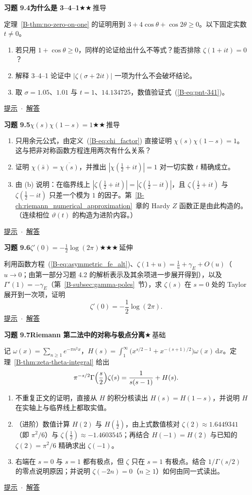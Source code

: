 \documentclass[11pt,a4paper]{article}
\newcommand{\dd}{\,\mathrm{d}}
\newcommand{\bref}[1]{\ref*{B-#1}}
\newcommand{\lvI}{$\bigstar$\,基础}
\newcommand{\lvII}{$\bigstar\bigstar$\,推导}
\newcommand{\lvIII}{$\bigstar\bigstar\bigstar$\,延伸}
\newcommand{\Q}[3]{%
  \par\addvspace{1.1em}\noindent
  \hypertarget{q:#1}{}\textbf{习题 #1}\quad\textbf{#3}\hfill{\small #2}\par
  \nopagebreak\smallskip}
\newcommand{\toHint}[1]{\hfill{\small\hyperlink{h:#1}{提示}\ $\cdot$\ \hyperlink{s:#1}{解答}}}
\begin{document}
\Q{9.4}{\lvII}{为什么是 3--4--1}
定理~\bref{thm:no-zero-on-one} 的证明用到 $3+4\cos\theta+\cos2\theta\ge0$。以下固定实数 $t\ne0$。
\begin{enumerate}
  \item 若只用 $1+\cos\theta\ge0$，同样的论证给出什么不等式？能否排除 $\zeta(1+it)=0$？
  \item 解释 3--4--1 论证中 $|\zeta(\sigma+2it)|$ 一项为什么不会破坏结论。
  \item 取 $\sigma=1.05$、$1.01$ 与 $t=1$、$14.134725$，数值验证式~(\bref{eq:pnt-341})。
\end{enumerate}
\toHint{9.4}

\Q{9.5}{\lvII}{$\chi(s)\chi(1-s)=1$}
\begin{enumerate}
  \item 只用余元公式，由定义~(\bref{eq:chi_factor}) 直接证明 $\chi(s)\chi(1-s)=1$。这与把非对称函数方程连用两次有什么关系？
  \item 证明 $\chi(\bar s)=\overline{\chi(s)}$，并推出 $|\chi(\tfrac12+it)|=1$ 对一切实数 $t$ 精确成立。
  \item 由 (b) 说明：在临界线上 $|\zeta(\tfrac12+it)|=|\zeta(\tfrac12-it)|$，且 $\zeta(\tfrac12+it)$ 与 $\zeta(\tfrac12-it)$ 只差一个模为 $1$ 的因子。第~\bref{ch:riemann_numerical_approximation}~章的 Hardy $Z$ 函数正是由此构造的。（连续相位 $\vartheta(t)$ 的构造为进阶内容。）
\end{enumerate}
\toHint{9.5}

\Q{9.6}{\lvIII}{$\zeta'(0)=-\tfrac12\log(2\pi)$}
利用函数方程~(\bref{eq:asymmetric_fe_alt})、$\zeta(1+u)=\frac1u+\gamma_E+O(u)$（$u\to0$；由第一部分习题 4.2 的解析表示及其余项进一步展开得到），以及 $\Gamma'(1)=-\gamma_E$（第~\bref{subsec:gamma-poles}~节），求 $\zeta(s)$ 在 $s=0$ 处的 Taylor 展开到一次项，证明
\[
  \zeta'(0)=-\frac12\log(2\pi).
\]
\toHint{9.6}

\Q{9.7}{\lvI}{Riemann 第二法中的对称与极点分离}
记 $\omega(x)=\sum_{n\ge1}e^{-\pi n^2x}$，$H(s)=\int_1^\infty\bigl(x^{s/2-1}+x^{-(s+1)/2}\bigr)\omega(x)\dd x$。定理~\bref{thm:zeta-theta-integral} 给出
\[
  \pi^{-s/2}\Gamma\Bigl(\frac s2\Bigr)\zeta(s)=\frac1{s(s-1)}+H(s).
\]
\begin{enumerate}
  \item 不重复正文的证明，直接从 $H$ 的积分核读出 $H(s)=H(1-s)$，并说明 $H$ 在实轴上与临界线上都取实值。
  \item （进阶）数值计算 $H(2)$ 与 $H(\tfrac12)$，由上式数值核对 $\zeta(2)\approx1.6449341$（即 $\pi^2/6$）与 $\zeta(\tfrac12)\approx-1.4603545$；再结合 $H(-1)=H(2)$ 与已知的 $\zeta(2)=\pi^2/6$ 精确求出 $\zeta(-1)$。
  \item 右端在 $s=0$ 与 $s=1$ 都有极点，但 $\zeta$ 只在 $s=1$ 有极点。结合 $1/\Gamma(s/2)$ 的零点说明原因；并说明 $\zeta(-2n)=0$（$n\ge1$）如何由同一式读出。
\end{enumerate}
\toHint{9.7}
\end{document}
